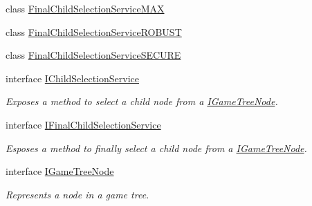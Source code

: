 \begin{DoxyCompactItemize}
class \mbox{\hyperlink{class_game_tree_core_1_1_final_child_selection_service_m_a_x}{Final\+Child\+Selection\+Service\+M\+AX}}
\item 
class \mbox{\hyperlink{class_game_tree_core_1_1_final_child_selection_service_r_o_b_u_s_t}{Final\+Child\+Selection\+Service\+R\+O\+B\+U\+ST}}
\item 
class \mbox{\hyperlink{class_game_tree_core_1_1_final_child_selection_service_s_e_c_u_r_e}{Final\+Child\+Selection\+Service\+S\+E\+C\+U\+RE}}
\item 
interface \mbox{\hyperlink{interface_game_tree_core_1_1_i_child_selection_service}{I\+Child\+Selection\+Service}}
\begin{DoxyCompactList}\small\item\em Exposes a method to select a child node from a \mbox{\hyperlink{interface_game_tree_core_1_1_i_game_tree_node}{I\+Game\+Tree\+Node}}. \end{DoxyCompactList}\item 
interface \mbox{\hyperlink{interface_game_tree_core_1_1_i_final_child_selection_service}{I\+Final\+Child\+Selection\+Service}}
\begin{DoxyCompactList}\small\item\em Esposes a method to finally select a child node from a \mbox{\hyperlink{interface_game_tree_core_1_1_i_game_tree_node}{I\+Game\+Tree\+Node}}. \end{DoxyCompactList}\item 
interface \mbox{\hyperlink{interface_game_tree_core_1_1_i_game_tree_node}{I\+Game\+Tree\+Node}}
\begin{DoxyCompactList}\small\item\em Represents a node in a game tree. ~\newline
\end{DoxyCompactList}\end{DoxyCompactItemize}
